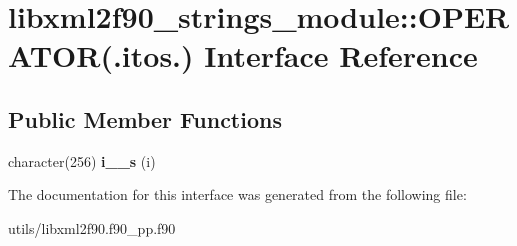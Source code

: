 \hypertarget{interfacelibxml2f90__strings__module_1_1OPERATOR_07_8itos_8_08}{
\section{libxml2f90\_\-strings\_\-module::OPERATOR(.itos.) Interface Reference}
\label{interfacelibxml2f90__strings__module_1_1OPERATOR_07_8itos_8_08}
}
\subsection*{Public Member Functions}
\begin{DoxyCompactItemize}
\item 
\hypertarget{interfacelibxml2f90__strings__module_1_1OPERATOR_07_8itos_8_08_a5bd02fc7c635e60217b753a4777efcbb}{
character(256) {\bfseries i\_\_\-s} (i)}
\label{interfacelibxml2f90__strings__module_1_1OPERATOR_07_8itos_8_08_a5bd02fc7c635e60217b753a4777efcbb}

\end{DoxyCompactItemize}


The documentation for this interface was generated from the following file:\begin{DoxyCompactItemize}
\item 
utils/libxml2f90.f90\_\-pp.f90\end{DoxyCompactItemize}
